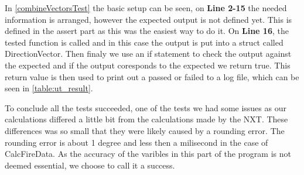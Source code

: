 In \autoref{combineVectorsTest} the basic setup can be seen, on \textbf{Line
2-15} the needed information is arranged, however the expected output is not
defined yet. This is defined in the assert part as this was the easiest way to
do it. On \textbf{Line 16}, the tested function is called and in this case the
output is put into a struct called DirectionVector. Then finaly we use an if
statement to check the output against the expected and if the output coresponds
to the expected we return true. This return value is then used to print out a
passed or failed to a log file, which can be seen in \autoref{table:ut_result}.\nl


To conclude all the tests succeeded, one of the tests we had some issues as our
calculations differed a little bit from the calculations made by the NXT. These
differences was so small that they were likely caused by a rounding error.
The rounding error is about 1 degree and less then a milisecond in the case of
CalcFireData. As the accuracy of the varibles in this part
of the program is not deemed essential, we choose to call it a success.
